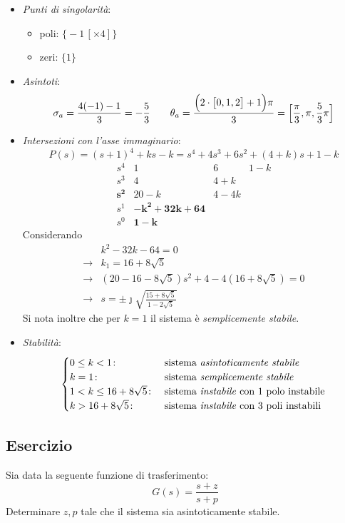 \begin{itemize}
	\item \emph{Punti di singolarità}:
		\begin{itemize}
			\item poli: \(\bigl\{-1\,[\times 4]\bigr\}\)
			\item zeri: \(\bigl\{1\bigr\}\)
		\end{itemize}
	\item \emph{Asintoti}:
		\[
			\sigma_a = \frac{4(-1)-1}{3} = -\frac{5}{3} \qquad
			\theta_a = \frac{\Bigl(2\cdot\bigl[0,1,2\bigr]+1\Bigr)\pi}{3} = \Bigl[\frac{\pi}{3},\pi,\frac{5}{3}\pi\Bigr]
		\]
	\item \emph{Intersezioni con l'asse immaginario}:
		\[
			P(s) = (s+1)^4 +ks -k = s^4+4s^3+6s^2+(4+k)s+1-k
		\]
		\[\begin{array}{r|rrr}
			s^4 & 1 & 6 & 1-k \\
			s^3 & 4 & 4+k \\
			\bm{s^2} & 20-k & 4-4k \\
			s^1 & \bm{-k^2+32k+64} \\
			s^0 & \bm{1-k}
		\end{array}\]
		Considerando
		\begin{align*}
			& k^2-32k-64=0 \\
			\rightarrow & k_1 = 16+8\sqrt{5} \\
			\rightarrow & (20-16-8\sqrt{5})s^2 +4-4(16+8\sqrt{5}) =0 \\
			\rightarrow & s=\pm\jmath\sqrt{\frac{15+8\sqrt{5}}{1-2\sqrt{5}}}
		\end{align*}
		Si nota inoltre che per \(k=1\) il sistema è \emph{semplicemente stabile}.
	\item \emph{Stabilità}:
		\[\begin{cases}
			0 \leq k < 1\colon & \text{sistema \emph{asintoticamente stabile}} \\
			k = 1\colon & \text{sistema \emph{semplicemente stabile}} \\
			1 < k \leq 16+8\sqrt{5}\colon & \text{sistema \emph{instabile} con 1 polo instabile} \\
			k > 16+8\sqrt{5}\colon & \text{sistema \emph{instabile} con 3 poli instabili}
		\end{cases}\]
\end{itemize}

\subsection{Esercizio}
Sia data la seguente funzione di trasferimento:
\[
	G(s) = \frac{s+z}{s+p}
\]
Determinare \(z,p\) tale che il sistema sia asintoticamente stabile.

